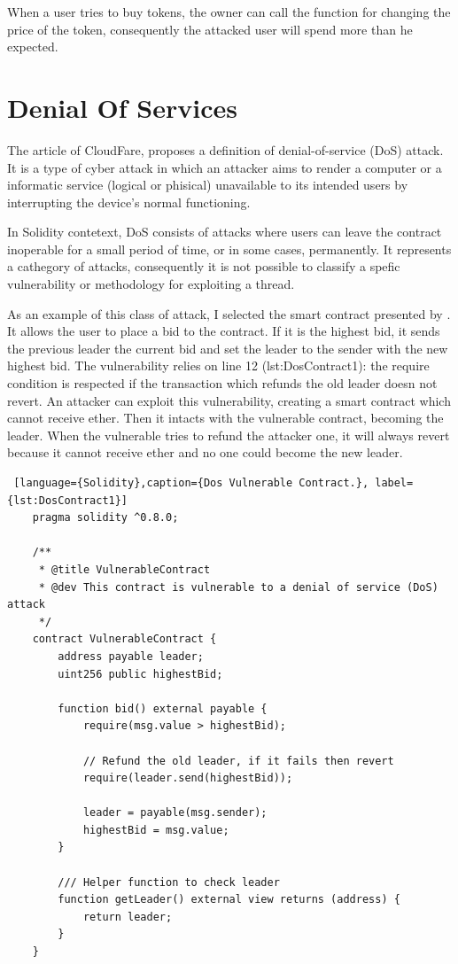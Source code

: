 When a user tries to buy tokens, the owner can call the function for changing the price of the token, consequently the attacked user will spend more than he expected.
 

\section{Denial Of Services}
\label{sec:Vulnerabilities:DOS}
The article \citet{CloudFareDos} of CloudFare, proposes a definition of denial-of-service (DoS) attack. It is a type of cyber attack in 
which an attacker aims to render a computer or a informatic service (logical or phisical) unavailable to its intended users by interrupting the 
device's normal functioning. 

In Solidity contetext, DoS consists of attacks where 
users can leave the contract inoperable for a small period of time, or in some cases, permanently.
It represents a cathegory of attacks, consequently it is not possible to classify a 
spefic vulnerability or methodology for exploiting a thread.

As an example of this class of attack, I selected the smart contract presented by \citet{Dos1}. 
It allows the user to place a bid to the contract. If it is the highest bid, it 
sends the previous leader the current bid and set the leader to the sender with the new highest bid.
The vulnerability relies on line 12 (\refname{lst:DosContract1}): the require condition is respected if the transaction which refunds the old leader doesn not revert. 
An attacker can exploit this vulnerability, creating a smart contract which cannot receive ether. Then it intacts with the vulnerable contract, becoming the leader.
When the vulnerable tries to refund the attacker one, it will always revert because it cannot receive ether and no one could become the new leader.

\begin{lstlisting} [language={Solidity},caption={Dos Vulnerable Contract.}, label={lst:DosContract1}]
    pragma solidity ^0.8.0;

    /**
     * @title VulnerableContract
     * @dev This contract is vulnerable to a denial of service (DoS) attack
     */
    contract VulnerableContract {
        address payable leader;
        uint256 public highestBid;
    
        function bid() external payable {
            require(msg.value > highestBid);
    
            // Refund the old leader, if it fails then revert
            require(leader.send(highestBid));
    
            leader = payable(msg.sender);
            highestBid = msg.value;
        }
    
        /// Helper function to check leader
        function getLeader() external view returns (address) {
            return leader;
        }
    }
    
\end{lstlisting}

